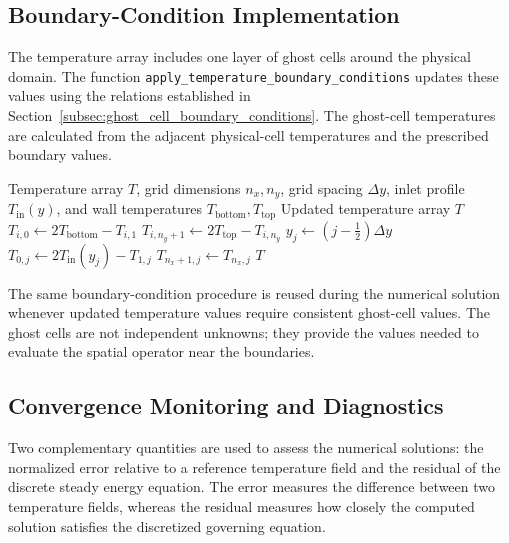 \subsection{Boundary-Condition Implementation}

The temperature array includes one layer of ghost cells around
the physical domain. The function
\texttt{apply\_temperature\_boundary\_conditions} updates these
values using the relations established in
Section~\ref{subsec:ghost_cell_boundary_conditions}. The
ghost-cell temperatures are calculated from the adjacent
physical-cell temperatures and the prescribed boundary values.

\begin{algorithm}[H]
\caption{Application of Temperature Boundary Conditions}
\label{alg:temperature_boundary_conditions}
\begin{algorithmic}[1]
\Require Temperature array $T$, grid dimensions $n_x,n_y$,
grid spacing $\Delta y$, inlet profile $T_{\mathrm{in}}(y)$,
and wall temperatures $T_{\mathrm{bottom}},T_{\mathrm{top}}$
\Ensure Updated temperature array $T$
    \State $T_{i,0}\gets 2T_{\mathrm{bottom}}-T_{i,1}$
    \State $T_{i,n_y+1}\gets 2T_{\mathrm{top}}-T_{i,n_y}$
\EndFor
{}
    \State $y_j\gets (j-\frac{1}{2})\Delta y$
    \State $T_{0,j}\gets 2T_{\mathrm{in}}(y_j)-T_{1,j}$
    \State $T_{n_x+1,j}\gets T_{n_x,j}$
\EndFor
\State \Return $T$
\end{algorithmic}
\end{algorithm}

The same boundary-condition procedure is reused during the
numerical solution whenever updated temperature values require
consistent ghost-cell values. The ghost cells are not independent
unknowns; they provide the values needed to evaluate the spatial
operator near the boundaries.

\subsection{Convergence Monitoring and Diagnostics}
\label{subsec:diagnostics}

Two complementary quantities are used to assess the numerical
solutions: the normalized error relative to a reference temperature
field and the residual of the discrete steady energy equation.
The error measures the difference between two temperature fields,
whereas the residual measures how closely the computed solution
satisfies the discretized governing equation.

